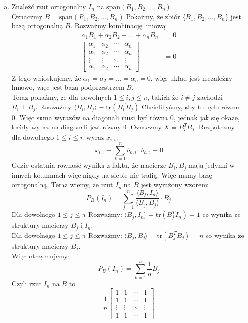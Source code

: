 \documentclass[11pt]{article}
\newcommand{\tr}{\mathrm{tr}}
\begin{document}
\begin{enumerate}[(a)]
    \item Znaleźć rzut ortogonalny $I_n$ na $\mathrm{span}(B_1, B_2, \ldots, B_n)$ \\[10pt]
    Oznaczmy $B = \mathrm{span}(B_1, B_2, \ldots, B_n)$ Pokażmy, że zbiór $\{B_1, B_2, \ldots, B_n\}$ jest bazą ortogonalną $B$. Rozważmy kombinację liniową:
    \begin{align*}
    \alpha_1 B_1 + \alpha_2 B_2 + \ldots + \alpha_n B_n &= 0 \\
    \begin{bmatrix}
        \alpha_1 & \alpha_2 & \cdots & \alpha_n \\
        \alpha_1 & \alpha_2 & \cdots & \alpha_n \\
        \vdots & \vdots & \ddots & \vdots \\
        \alpha_1 & \alpha_2 & \cdots & \alpha_n
    \end{bmatrix} &= 0
    \end{align*}
    Z tego wnioskujemy, że $\alpha_1 = \alpha_2 = \ldots = \alpha_n = 0$, więc układ jest niezależny liniowo, więc jest bazą podprzestrzeni $B$.\\[5pt]
    Teraz pokażmy, że dla dowolnych $1 \leq i, j \leq n$, takich że $i \neq j$ zachodzi $B_i \perp B_j$. Rozważmy $\langle B_i, B_j \rangle = \tr (B_i^T B_j)$ Chcielibyśmy, aby to było równe 0. Więc suma wyrazów na diagonali musi być równa 0, jednak jak się okaże, każdy wyraz na diagonali jest równy 0. Oznaczmy $X = B_i^T B_j$. Rozpatrzmy dla dowolnego $1 \leq i \leq n$ wyraz $x_{i,i}$:
    $$x_{i,i} = \sum_{k = 1}^n b_{k, i} \cdot b_{k, i} = 0$$
    Gdzie ostatnia równość wynika z faktu, że macierze $B_i, B_j$ mają jedynki w innych kolumnach więc nigdy na siebie nie trafią. Więc mamy bazę ortogonalną. Teraz wiemy, że rzut $I_n$ na $B$ jest wyrażony wzorem:
    $$P_B(I_n) = \sum_{j = 1}^n \frac{\langle B_j, I_n \rangle}{\langle B_j, B_j \rangle} \cdot B_j$$
    Dla dowolnego $1 \leq j \leq n$ Rozważmy: $\langle B_j, I_n \rangle = \tr(B_j^T I_n) = 1$ co wynika ze struktury macierzy $B_j$ i $I_n$. \\[5pt]
    Dla dowolnego $1 \leq j \leq n$ Rozważmy: $\langle B_j, B_j \rangle = \tr(B_j^T B_j) = n$ co wynika ze struktury macierzy $B_j$.\\[5pt]
    Więc otrzymujemy:
    $$P_B(I_n) = \sum_{k = 1}^n \frac{1}{n}B_j$$
    Czyli rzut $I_n$ na $B$ to
    $$\frac{1}{n} \begin{bmatrix}
        1 & 1 & \cdots & 1 \\
        1 & 1 & \cdots & 1 \\
        \vdots & \vdots & \ddots & \vdots \\
        1 & 1 & \cdots & 1
    \end{bmatrix}$$
\end{enumerate}
\end{document}
